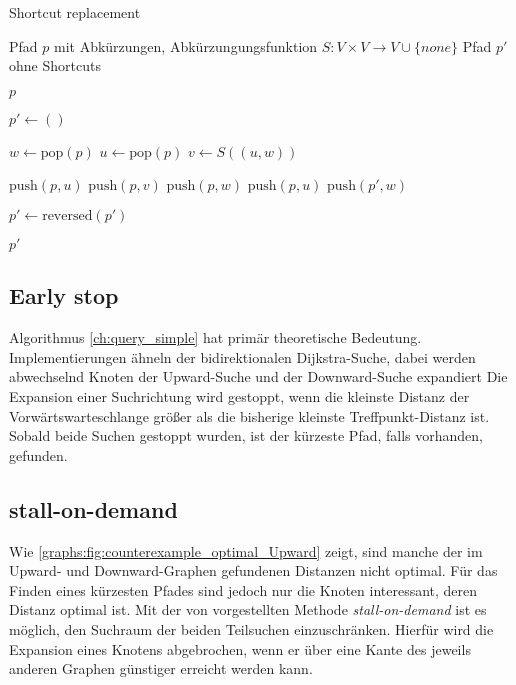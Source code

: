 \begin{algorithm}[ht]
  \caption{Shortcut replacement}
  \begin{algorithmic}[1]
    \Require Pfad $p$ mit Abkürzungen, Abkürzungungsfunktion $S \colon V \times V \to V \cup \{ {none} \}$
    \Ensure Pfad $p'$ ohne Shortcuts

    \State \Return $p$
    \EndIf
    \State

    \State $p' \leftarrow ()$
    \State

    \State $w \leftarrow \text{pop}(p)$
    \State $u \leftarrow \text{pop}(p)$
    \State $v \leftarrow S((u, w))$
    \State

    \State $\text{push}(p, u)$
    \State $\text{push}(p, v)$
    \State $\text{push}(p, w)$
    \Else
    \State $\text{push}(p, u)$
    \State $\text{push}(p', w)$
    \EndIf
    \EndWhile

    \State
    \State $p' \leftarrow \text{reversed}(p')$

    \State
    \State \Return $p'$
  \end{algorithmic}
  \label{ch:alg:shortcut_replacement}
\end{algorithm}

\subsection{Early stop}

Algorithmus \ref{ch:query_simple} hat primär theoretische Bedeutung.
Implementierungen ähneln der bidirektionalen Dijkstra-Suche, dabei werden abwechselnd Knoten der Upward-Suche und der Downward-Suche expandiert
Die Expansion einer Suchrichtung wird gestoppt, wenn die kleinste Distanz der Vorwärtswarteschlange größer als die bisherige kleinste Treffpunkt-Distanz ist.
Sobald beide Suchen gestoppt wurden, ist der kürzeste Pfad, falls vorhanden, gefunden.

\subsection{stall-on-demand}

Wie \autoref{graphs:fig:counterexample_optimal_Upward} zeigt, sind manche der im Upward- und Downward-Graphen gefundenen Distanzen nicht optimal.
Für das Finden eines kürzesten Pfades sind jedoch nur die Knoten interessant, deren Distanz optimal ist.
Mit der von \cite{schultes2007dynamic} vorgestellten Methode \emph{stall-on-demand} ist es möglich, den Suchraum der beiden Teilsuchen einzuschränken.
Hierfür wird die Expansion eines Knotens abgebrochen, wenn er über eine Kante des jeweils anderen Graphen günstiger erreicht werden kann.

